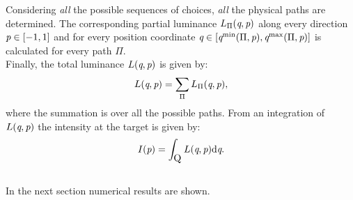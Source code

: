 Considering \textit{all} the possible sequences of choices, \textit{all} the physical paths are determined. The corresponding partial luminance $L_{\Pi}(\textit{q}, \textit{p})$ along every direction $\textit{p}\in [-1,1]$ and for every position coordinate $\textit{q}\in[\textit{q}^{\textrm{min}}(\Pi, \textit{p}), \textit{q}^{\textrm{max}}(\Pi, \textit{p})]$ is calculated for every path $\Pi$. 
\\ \indent Finally, the total luminance $L(\textit{q}, \textit{p})$ is given by:
\begin{equation}\label{eq:luminance_fresnel}
L(\textit{q}, \textit{p}) = \sum_{\Pi}L_{\Pi}(\textit{q}, \textit{p}),
\end{equation} 
where the summation is over all the possible paths. 
From an integration of $L(\textit{q}, \textit{p})$ the intensity at the target is given by:
\begin{equation}\label{eq:intensity_fresnel}
I(\textit{p}) = \int_{\mbox{$\textup{Q}_{\textit{}}$}}L(\textit{q}, \textit{p})\textrm{d}\textit{q}.
\end{equation}
\\ \indent In the next section numerical results are shown.
